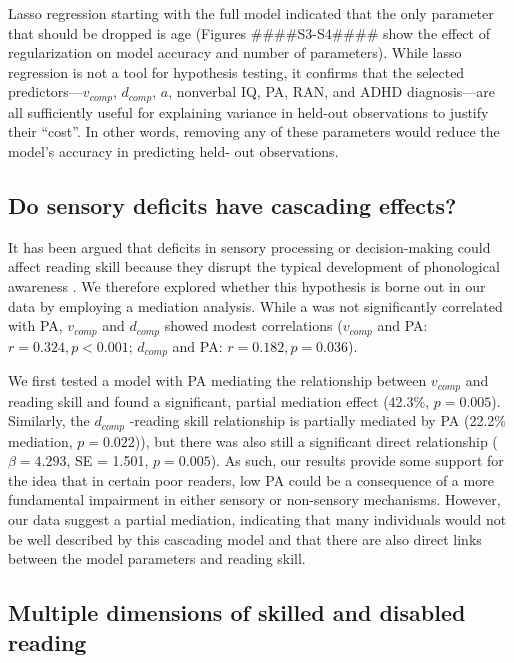 \documentclass[../uwthesis.tex]{subfiles}
\begin{document}
Lasso regression starting with the full model indicated that the only parameter that should
be dropped is age (Figures ####S3-S4#### show the effect of regularization on model accuracy and number
of parameters). While lasso regression is not a tool for hypothesis testing, it confirms that the
selected predictors—$v_{comp}$, $d_{comp}$, $a$, nonverbal IQ, PA, RAN, and ADHD diagnosis—are all
sufficiently useful for explaining variance in held-out observations to justify their “cost”. In other
words, removing any of these parameters would reduce the model’s accuracy in predicting held-
out observations.

\subsection{Do sensory deficits have cascading effects?}
It has been argued that deficits in sensory processing or decision-making could affect
reading skill because they disrupt the typical development of phonological awareness 
\cite{Lieder2019PerceptualDyslexia,Manis1997AreDyslexia,Richardson2004AuditoryChildren}. We
therefore explored whether this hypothesis is borne out in our data by employing a mediation
analysis. While a was not significantly correlated with PA, $v_{comp}$ and $d_{comp}$ showed modest
correlations ($v_{comp}$ and PA: $r = 0.324, p < 0.001$; $d_{comp}$ and PA: $r = 0.182, p = 0.036$).

We first tested a model with PA mediating the relationship between $v_{comp}$ and reading skill
and found a significant, partial mediation effect (42.3\%, $p = 0.005$). Similarly, the $d_{comp}$ -reading
skill relationship is partially mediated by PA (22.2\% mediation, $p = 0.022$)), but there was also
still a significant direct relationship ($\beta = 4.293$, SE = 1.501, $p = 0.005$). As such, our results
provide some support for the idea that in certain poor readers, low PA could be a consequence of
a more fundamental impairment in either sensory or non-sensory mechanisms. However, our data
suggest a partial mediation, indicating that many individuals would not be well described by this
cascading model and that there are also direct links between the model parameters and reading
skill.

\subsection{Multiple dimensions of skilled and disabled reading}
\end{document}
